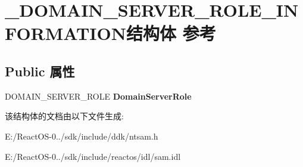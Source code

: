 \hypertarget{struct___d_o_m_a_i_n___s_e_r_v_e_r___r_o_l_e___i_n_f_o_r_m_a_t_i_o_n}{}\section{\+\_\+\+D\+O\+M\+A\+I\+N\+\_\+\+S\+E\+R\+V\+E\+R\+\_\+\+R\+O\+L\+E\+\_\+\+I\+N\+F\+O\+R\+M\+A\+T\+I\+O\+N结构体 参考}
\label{struct___d_o_m_a_i_n___s_e_r_v_e_r___r_o_l_e___i_n_f_o_r_m_a_t_i_o_n}
\subsection*{Public 属性}
\begin{DoxyCompactItemize}
\item 
\mbox{\label{struct___d_o_m_a_i_n___s_e_r_v_e_r___r_o_l_e___i_n_f_o_r_m_a_t_i_o_n_a6728862317f51e33ed2a828f53987a2a}} 
D\+O\+M\+A\+I\+N\+\_\+\+S\+E\+R\+V\+E\+R\+\_\+\+R\+O\+LE {\bfseries Domain\+Server\+Role}
\end{DoxyCompactItemize}


该结构体的文档由以下文件生成\+:\begin{DoxyCompactItemize}
\item 
E\+:/\+React\+O\+S-\/0../sdk/include/ddk/ntsam.\+h\item 
E\+:/\+React\+O\+S-\/0../sdk/include/reactos/idl/sam.\+idl\end{DoxyCompactItemize}
